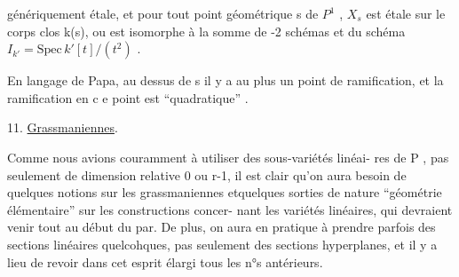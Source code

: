 
génériquement étale, et pour tout point géométrique  s de $P^1$ ,  $X_s$
est étale sur le corps \hand{$-$} clos  k(s), ou   est
isomorphe à la somme de -2  schémas    et   du schéma  
$I_{k'} = \mathrm{Spec}\, k'[t]/(t^2)$ .

En langage de Papa, au  dessus de s  il y a au plus un point de
ramification, et la ramification en c e point est ``quadratique'' .

11.  \uline{Grassmaniennes}. 

Comme nous avions couramment à utiliser des sous-variétés linéai-%
res de P , pas seulement de dimension relative 0 ou r-1, il est clair
qu'on aura besoin de quelques notions sur les grassmaniennes  etquelques
sorties de nature ``géométrie élémentaire'' sur les constructions concer-%
nant les variétés linéaires, qui  devraient venir tout au début du par.
De plus, on aura en pratique à prendre parfois des sections linéaires
quelcohques, pas seulement des sections hyperplanes, et il y a lieu de
revoir dans cet esprit élargi tous les n°s antérieurs.

